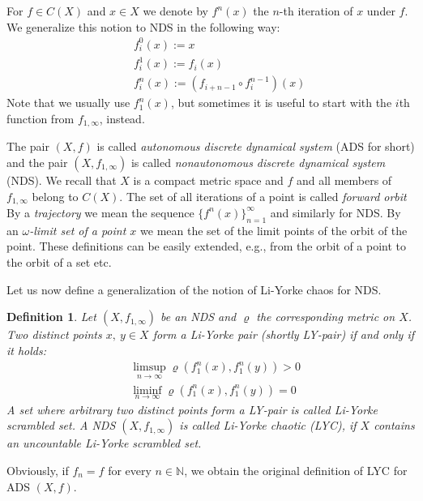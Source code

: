 \documentclass{amsart}
\newtheorem{defini}{Definition}
\begin{document}
For $f\in C(X)$ and $x\in X$ we denote by $f^n(x)$ the $n$-th iteration of $x$ under $f$. We generalize this notion to NDS in the following way:
\begin{eqnarray*}
&& f^0_i(x) := x\\
&& f^1_i(x) := f_i(x)\\
&& f^n_i(x) := (f_{i+n-1} \circ f^{n-1}_i)(x)
\end{eqnarray*}
Note that we usually use $f^n_1(x)$, but sometimes it is useful to start with the $i$th function from $f_{1,\infty}$, instead.

The pair $(X,f)$ is called {\sl autonomous discrete dynamical system} (ADS for short) and the pair $(X,f_{1,\infty})$ is called {\sl nonautonomous discrete dynamical system} (NDS). We recall that $X$ is a compact metric space and $f$ and all members of $f_{1,\infty}$ belong to $C(X)$. The set of all iterations of a point is called {\sl forward orbit} %
By a {\sl trajectory} we mean the sequence $\{f^n(x)\}_{n=1}^\infty$ and similarly for NDS. By an {\sl $\omega$-limit set of a point $x$} we mean the set of the limit points of the orbit of the point. These definitions can be easily extended, e.g., from the orbit of a point to the orbit of a set etc.

Let us now define a generalization of the notion of Li-Yorke chaos for NDS.

\begin{defini}
Let $(X,f_{1,\infty})$ be an NDS and $\varrho$ the corresponding metric on $X$. Two distinct points $x,\ y \in X$ form a {\sl Li-Yorke pair} (shortly {\sl LY-pair}) if and only if it holds:
\begin{eqnarray*}
& \limsup_{n \rightarrow \infty} \varrho(f_1^n(x),f_1^n(y)) > 0\\
& \liminf_{n \rightarrow \infty} \varrho(f_1^n(x),f_1^n(y)) = 0
\end{eqnarray*}
A set where arbitrary two distinct points form a LY-pair is called {\sl Li-Yorke scrambled set}.
A NDS $(X,f_{1,\infty})$ is called {\sl Li-Yorke chaotic} (LYC), if $X$ contains an uncountable Li-Yorke scrambled set.
\end{defini}

Obviously, if $f_n = f$ for every $n\in\mathbb{N}$, we obtain the original definition of LYC for ADS $(X,f)$.
\end{document}
